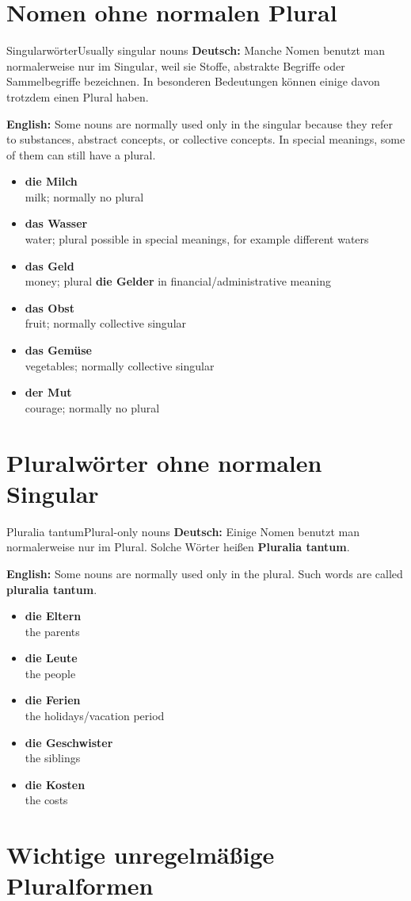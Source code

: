 \documentclass[a4paper,11pt]{article}
\newcommand{\GermanText}[1]{\textbf{Deutsch: }#1\par}
\newcommand{\EnglishText}[1]{{\small\color{SoftGray}\textbf{English: }#1\par}}
\newcommand{\ExampleItem}[2]{\item \textbf{#1}\\{\small\color{SoftGray}#2}}
\begin{document}
\section{Nomen ohne normalen Plural}

\begin{grammarentry}{Singularwörter}{Usually singular nouns}
\GermanText{Manche Nomen benutzt man normalerweise nur im Singular, weil sie Stoffe, abstrakte Begriffe oder Sammelbegriffe bezeichnen. In besonderen Bedeutungen können einige davon trotzdem einen Plural haben.}
\EnglishText{Some nouns are normally used only in the singular because they refer to substances, abstract concepts, or collective concepts. In special meanings, some of them can still have a plural.}
\begin{exbox}
\begin{itemize}
\ExampleItem{die Milch}{milk; normally no plural}
\ExampleItem{das Wasser}{water; plural possible in special meanings, for example different waters}
\ExampleItem{das Geld}{money; plural \textbf{die Gelder} in financial/administrative meaning}
\ExampleItem{das Obst}{fruit; normally collective singular}
\ExampleItem{das Gemüse}{vegetables; normally collective singular}
\ExampleItem{der Mut}{courage; normally no plural}
\end{itemize}
\end{exbox}
\end{grammarentry}

\section{Pluralwörter ohne normalen Singular}

\begin{grammarentry}{Pluralia tantum}{Plural-only nouns}
\GermanText{Einige Nomen benutzt man normalerweise nur im Plural. Solche Wörter heißen \textbf{Pluralia tantum}.}
\EnglishText{Some nouns are normally used only in the plural. Such words are called \textbf{pluralia tantum}.}
\begin{exbox}
\begin{itemize}
\ExampleItem{die Eltern}{the parents}
\ExampleItem{die Leute}{the people}
\ExampleItem{die Ferien}{the holidays/vacation period}
\ExampleItem{die Geschwister}{the siblings}
\ExampleItem{die Kosten}{the costs}
\end{itemize}
\end{exbox}
\end{grammarentry}

\section{Wichtige unregelmäßige Pluralformen}
\end{document}
